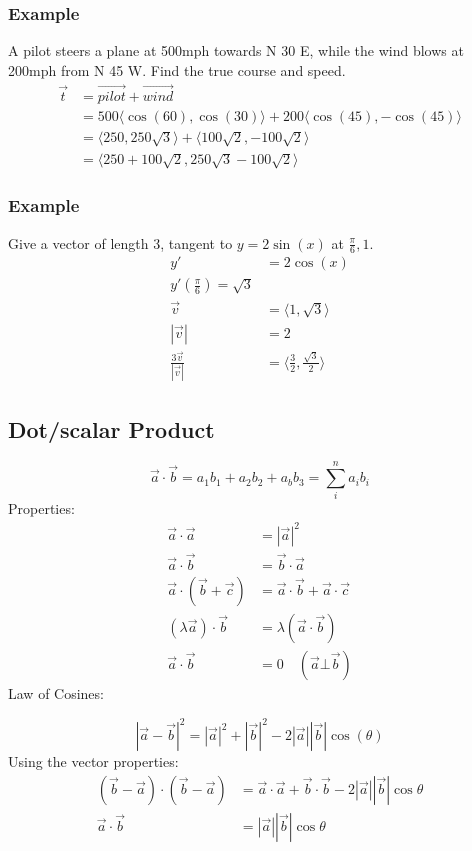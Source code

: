 \documentclass{math}
\begin{document}
\subsubsection*{Example}
A pilot steers a plane at 500mph towards N 30 E, while the wind blows at 200mph
from N 45 W. Find the true course and speed.
\begin{align*}
  \vec{t} &= \overrightarrow{pilot}+\overrightarrow{wind} \\
  &= 500\langle\cos(60),\cos(30)\rangle+200\langle\cos(45),-\cos(45)\rangle \\
  &= \langle250,250\sqrt{3}\rangle+\langle100\sqrt{2},-100\sqrt{2}\rangle \\
  &= \langle250+100\sqrt{2},250\sqrt{3}-100\sqrt{2}\rangle
\end{align*}

\subsubsection*{Example}
Give a vector of length 3, tangent to \( y = 2\sin(x) \) at
\( \frac{\pi}{6},1 \).
\begin{align*}
  y' &= 2\cos(x) \\
  y'(\frac{\pi}{6}) = \sqrt{3} \\
  \vec{v} &= \langle1,\sqrt{3}\rangle \\
  |\vec{v}| &= 2 \\
  \frac{3\vec{v}}{|\vec{v}|} &= \langle\frac{3}{2},\frac{\sqrt{3}}{2}\rangle
\end{align*}

\subsection*{Dot/scalar Product}
\[ \vec{a}\cdot\vec{b} = a_{1}b_{1}+a_{2}b_{2}+a_{b}b_{3} =
   \sum_{i}^{n}a_{i}b_{i} \]
Properties:
\begin{align*}
  \vec{a}\cdot\vec{a} &= |\vec{a}|^{2} \\
  \vec{a}\cdot\vec{b} &= \vec{b}\cdot\vec{a} \\
  \vec{a}\cdot(\vec{b}+\vec{c}) &= \vec{a}\cdot\vec{b}+\vec{a}\cdot\vec{c} \\
  (\lambda\vec{a})\cdot\vec{b} &= \lambda(\vec{a}\cdot\vec{b}) \\
  \vec{a}\cdot\vec{b} &= 0 \quad (\vec{a}\bot\vec{b})
\end{align*}
Law of Cosines:
\begin{center}
\end{center}
\[ |\vec{a}-\vec{b}|^{2} = |\vec{a}|^{2}+|\vec{b}|^{2}-
  2|\vec{a}||\vec{b}|\cos(\theta) \]
Using the vector properties:
\begin{align*}
  (\vec{b}-\vec{a})\cdot(\vec{b}-\vec{a}) &=
    \vec{a}\cdot\vec{a}+\vec{b}\cdot\vec{b}-2|\vec{a}||\vec{b}|\cos\theta \\
  \vec{a}\cdot\vec{b} &= |\vec{a}||\vec{b}|\cos\theta
\end{align*}
\end{document}
